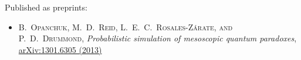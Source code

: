 Published as preprints:

\begin{itemize}
\item[\hfleuron] \textsc{B.~Opanchuk, M.~D.~Reid, L.~E.~C.~Rosales-Z\'arate, \textnormal{and} P.~D.~Drummond}, \textit{Probabilistic simulation of mesoscopic quantum paradoxes}, \href{http://arxiv.org/abs/1301.6305}{arXiv:1301.6305 (2013)}
\end{itemize}
